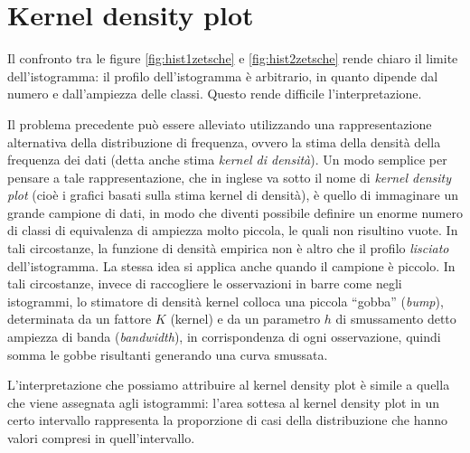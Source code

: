 \documentclass[
  10pt,
  italian,
  a4paper,
  extrafontsizes,onecolumn,openright
  ]{memoir}
\theoremstyle{definition}
\theoremstyle{definition}
\theoremstyle{definition}
\theoremstyle{definition}
\theoremstyle{remark}
\begin{document}
\hypertarget{kernel-density-plot}{%
\section{Kernel density plot}\label{kernel-density-plot}}

Il confronto tra le figure \ref{fig:hist1zetsche} e \ref{fig:hist2zetsche} rende chiaro il limite dell'istogramma: il profilo dell'istogramma è arbitrario, in quanto dipende dal numero e dall'ampiezza delle classi. Questo rende difficile l'interpretazione.

Il problema precedente può essere alleviato utilizzando una
rappresentazione alternativa della distribuzione di frequenza, ovvero la
stima della densità della frequenza dei dati (detta anche stima \emph{kernel
di densità}). Un modo semplice per pensare a tale rappresentazione, che
in inglese va sotto il nome di \emph{kernel density plot} (cioè i grafici basati sulla stima kernel di densità), è quello di immaginare un grande campione di dati, in modo che diventi possibile definire un enorme numero di classi di equivalenza di ampiezza molto piccola, le quali non risultino vuote. In tali circostanze, la funzione di densità empirica non è altro che il profilo \emph{lisciato} dell'istogramma. La stessa idea si applica anche quando il campione è piccolo. In tali circostanze, invece di raccogliere le osservazioni in barre come negli istogrammi, lo stimatore di densità kernel colloca una piccola ``gobba'' (\emph{bump}), determinata da un fattore \(K\) (kernel) e da un parametro \(h\) di smussamento detto ampiezza di banda (\emph{bandwidth}), in corrispondenza di ogni osservazione, quindi somma le gobbe risultanti generando una curva smussata.

L'interpretazione che possiamo attribuire al kernel density plot è simile a quella che viene assegnata agli istogrammi: l'area sottesa al kernel density plot in un certo intervallo rappresenta la proporzione di casi della distribuzione che hanno valori compresi in quell'intervallo.
\end{document}

